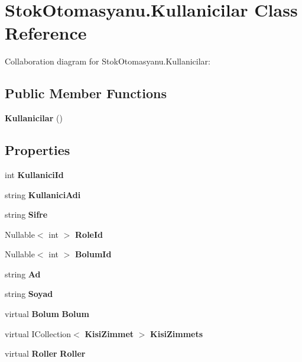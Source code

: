 \section{Stok\+Otomasyanu.\+Kullanicilar Class Reference}
\label{class_stok_otomasyanu_1_1_kullanicilar}


Collaboration diagram for Stok\+Otomasyanu.\+Kullanicilar\+:
\subsection*{Public Member Functions}
\begin{DoxyCompactItemize}
\item 
\textbf{ Kullanicilar} ()
\end{DoxyCompactItemize}
\subsection*{Properties}
\begin{DoxyCompactItemize}
\item 
int \textbf{ Kullanici\+Id}\hspace{0.3cm}{\ttfamily  [get, set]}
\item 
string \textbf{ Kullanici\+Adi}\hspace{0.3cm}{\ttfamily  [get, set]}
\item 
string \textbf{ Sifre}\hspace{0.3cm}{\ttfamily  [get, set]}
\item 
Nullable$<$ int $>$ \textbf{ Role\+Id}\hspace{0.3cm}{\ttfamily  [get, set]}
\item 
Nullable$<$ int $>$ \textbf{ Bolum\+Id}\hspace{0.3cm}{\ttfamily  [get, set]}
\item 
string \textbf{ Ad}\hspace{0.3cm}{\ttfamily  [get, set]}
\item 
string \textbf{ Soyad}\hspace{0.3cm}{\ttfamily  [get, set]}
\item 
virtual \textbf{ Bolum} \textbf{ Bolum}\hspace{0.3cm}{\ttfamily  [get, set]}
\item 
virtual I\+Collection$<$ \textbf{ Kisi\+Zimmet} $>$ \textbf{ Kisi\+Zimmets}\hspace{0.3cm}{\ttfamily  [get, set]}
\item 
virtual \textbf{ Roller} \textbf{ Roller}\hspace{0.3cm}{\ttfamily  [get, set]}
\end{DoxyCompactItemize}


